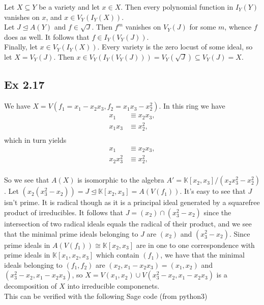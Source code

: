 \documentclass{article}
\theoremstyle{definition}
\newcommand{\K}{\mathbb{K}}
\begin{document}
Let $X \subseteq Y$ be a variety and let $x \in X$. Then 
every polynomial function in $I_Y(Y)$ vanishes on $x$, and $x \in V_{Y}(I_{Y}(X))$. \\

Let $J \unlhd A(Y)$ and $f \in \sqrt{J}$. Then $f^m$ vanishes on $V_{Y}(J)$ for some $m$,
whence $f$ does as well. It follows that $f \in I_{Y}(V_{Y}(J))$. \\

Finally, let $x \in V_{Y}(I_Y(X))$. Every variety is the zero locust of some
ideal, so let $X = V_{Y}(J)$. Then $x \in V_Y(I_Y(V_Y(J))) = V_Y(\sqrt{J})
\subseteq V_{Y}(J) = X$.


\subsection*{Ex 2.17}

We have $X = V\left(f_1 = x_1 - x_2x_3, f_2 = x_1x_3 - x_2^{2}\right)$. In this ring we have
\begin{align*}
	x_1
	&\equiv
	x_2x_3, \\
	x_1x_3 
	&\equiv
	x_2^{2}, \\
\end{align*}
which in turn yields
\begin{align*}
	x_1
	&\equiv
	x_2x_3, \\
	x_2x_3^{2} 
	&\equiv
	x_2^{2}, \\
\end{align*}

So we see that $A(X)$ is isomorphic to the algebra $A' = \K[x_2,
x_3]/(x_2x_3^{2} - x_2^{2})$. Let $(x_2(x_3^{2} - x_2)) = J \unlhd \K[x_2, x_3]
= A(V(f_1))$. It's easy to see that $J$ isn't prime. It is radical though as it
is a principal ideal generated by a squarefree product of irreducibles. It
follows that $J = (x_2) \cap (x_3^{2} - x_2)$ since the intersection of two
radical ideals equals the radical of their product, and we see that the minimal
prime ideals belonging to $J$ are $(x_2)$ and $(x_3^{2} - x_2)$. Since prime
ideals in $A(V(f_1)) \cong \K[x_2, x_3]$ are in one to one correspondence with
prime ideals in $\K[x_1, x_2, x_3]$ which contain $(f_1)$, we have that the
minimal ideals belonging to $(f_1, f_2)$ are $(x_2, x_1 - x_2x_3) = (x_1, x_2)$
and $(x_3^{2} - x_2, x_1 - x_2x_3)$, so $X = V(x_1, x_2) \cup V(x_3^{2} - x_2,
x_1 - x_2x_3)$ is a decomposition of $X$ into irreducible componenets. \\

This can be verified with the following Sage code (from python3)
\end{document}

